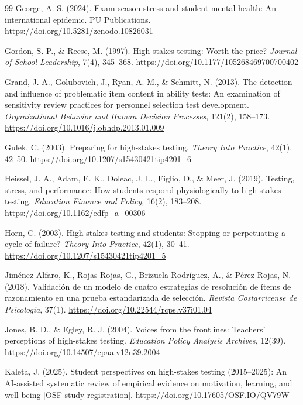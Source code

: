 \documentclass[11pt]{article}
\begin{document}
\begin{thebibliography}{99}
George, A. S. (2024). Exam season stress and student mental health: An international epidemic. PU Publications. \url{https://doi.org/10.5281/zenodo.10826031}

Gordon, S. P., \& Reese, M. (1997). High-stakes testing: Worth the price? \textit{Journal of School Leadership}, 7(4), 345--368. \url{https://doi.org/10.1177/105268469700700402}

Grand, J. A., Golubovich, J., Ryan, A. M., \& Schmitt, N. (2013). The detection and influence of problematic item content in ability tests: An examination of sensitivity review practices for personnel selection test development. \textit{Organizational Behavior and Human Decision Processes}, 121(2), 158--173. \url{https://doi.org/10.1016/j.obhdp.2013.01.009}

Gulek, C. (2003). Preparing for high-stakes testing. \textit{Theory Into Practice}, 42(1), 42--50. \url{https://doi.org/10.1207/s15430421tip4201_6}

Heissel, J. A., Adam, E. K., Doleac, J. L., Figlio, D., \& Meer, J. (2019). Testing, stress, and performance: How students respond physiologically to high-stakes testing. \textit{Education Finance and Policy}, 16(2), 183--208. \url{https://doi.org/10.1162/edfp_a_00306}

Horn, C. (2003). High-stakes testing and students: Stopping or perpetuating a cycle of failure? \textit{Theory Into Practice}, 42(1), 30--41. \url{https://doi.org/10.1207/s15430421tip4201_5}

Jim\'enez Alfaro, K., Rojas-Rojas, G., Brizuela Rodr\'iguez, A., \& P\'erez Rojas, N. (2018). Validaci\'on de un modelo de cuatro estrategias de resoluci\'on de \'items de razonamiento en una prueba estandarizada de selecci\'on. \textit{Revista Costarricense de Psicolog\'ia}, 37(1). \url{https://doi.org/10.22544/rcps.v37i01.04}

Jones, B. D., \& Egley, R. J. (2004). Voices from the frontlines: Teachers' perceptions of high-stakes testing. \textit{Education Policy Analysis Archives}, 12(39). \url{https://doi.org/10.14507/epaa.v12n39.2004}

Kaleta, J. (2025). Student perspectives on high-stakes testing (2015--2025): An AI-assisted systematic review of empirical evidence on motivation, learning, and well-being [OSF study registration]. \url{https://doi.org/10.17605/OSF.IO/QV79W}


\end{thebibliography}
\end{document}
